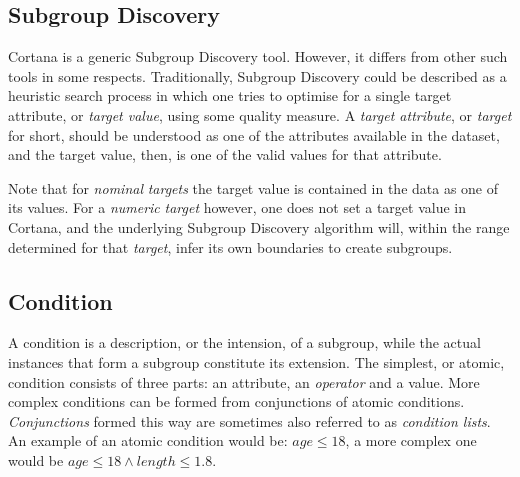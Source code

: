 \documentclass{article}
\begin{document}
\subsection{Subgroup Discovery}
\label{preliminaries:subgroup-discovery}
Cortana is a generic Subgroup Discovery tool.
However, it differs from other such tools in some respects.
Traditionally, Subgroup Discovery could be described as a heuristic search process in which one tries to optimise for a single target attribute, or \emph{target value}, using some quality measure.
A \emph{target attribute}, or \emph{target} for short, should be understood as one of the attributes available in the dataset, and the target value, then, is one of the valid values for that attribute.

Note that for \emph{nominal} \emph{targets} the target value is contained in the data as one of its values.
For a \emph{numeric} \emph{target} however, one does not set a target value in Cortana, and the underlying Subgroup Discovery algorithm will, within the range determined for that \emph{target}, infer its own boundaries to create subgroups.



\subsection{Condition}
\label{preliminaries:condition}
A condition is a description, or the intension, of a subgroup, while the actual instances that form a subgroup constitute its extension.
The simplest, or atomic, condition consists of three parts: an attribute, an \emph{operator} and a value.
More complex conditions can be formed from conjunctions of atomic conditions.
\emph{Conjunctions} formed this way are sometimes also referred to as \emph{condition lists}.
An example of an atomic condition would be: $age \leq 18$, a more complex one would be $age \leq 18 \wedge length \leq 1.8$.






\end{document}
